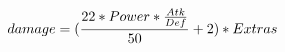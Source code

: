 \documentclass[preview]{standalone}
\begin{document}
\begin{align*}
\special{dvisvgm:raw <g id='unique000'>}damage = (\frac{22 * Power * \frac{Atk}{Def}}{50} + 2) * Extras\special{dvisvgm:raw </g>}
\end{align*}
\end{document}

